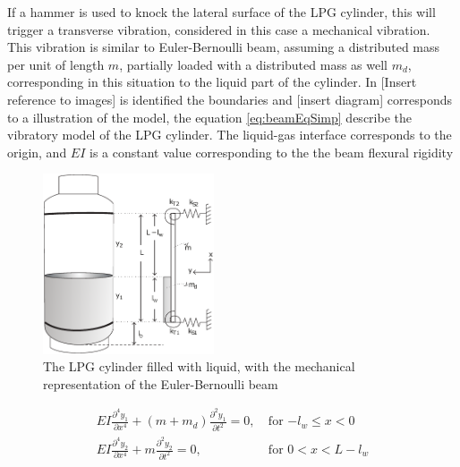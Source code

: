 If a hammer is used to knock the lateral surface of the LPG cylinder, this will trigger a transverse vibration, considered in this case a mechanical vibration. This vibration is similar to Euler-Bernoulli beam, assuming a distributed mass per unit of length $m$, partially loaded with a distributed mass as well $m_d$, corresponding in this situation to the liquid part of the cylinder. In [Insert reference to images] is identified the boundaries and [insert diagram] corresponds to a illustration of the model, the  equation \ref{eq:beamEqSimp} describe the vibratory model of the LPG cylinder. The liquid-gas interface corresponds to the origin, and $EI$ is a constant value corresponding to the the beam flexural rigidity
\begin{figure}[!htb]
    \centering
    \includegraphics[width=0.45\textwidth]{Chapters/2CHP/Diagrams/mathmodelLPG.pdf}
    \caption{The LPG cylinder filled with liquid, with the mechanical representation of the Euler-Bernoulli beam\cite{wuLiquidLevelDetector2014b}}
    \label{fig:mechanicalmodel}
\end{figure}
\begin{equation} \label{eq:beamEqSimp}
    \begin{split}
        EI\frac{\partial^4y_1}{\partial x^4} + (m + m_d)\frac{\partial^2y_1}{\partial t^2} = 0,\> & \text{for $-l_w \leq x < 0$} \\
        EI\frac{\partial^4y_2}{\partial x^4} + m\frac{\partial^2y_2}{\partial t^2} = 0,\> & \text{for $0 < x < L-l_w$}
    \end{split}
\end{equation}

